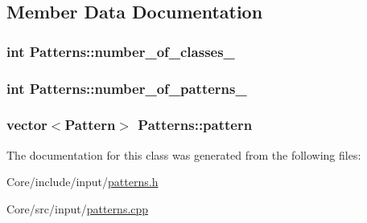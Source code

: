 \subsection{Member Data Documentation}
\hypertarget{classPatterns_aab8d09618ac4738672d7dfce0d462662}{
\subsubsection[{number\+\_\+of\+\_\+classes\+\_\+}]{\setlength{\rightskip}{0pt plus 5cm}int Patterns\+::number\+\_\+of\+\_\+classes\+\_\+\hspace{0.3cm}{\ttfamily [private]}}}\label{classPatterns_aab8d09618ac4738672d7dfce0d462662}
\hypertarget{classPatterns_ad26e3821e74fa46efdac09df9ca0f72a}{
\subsubsection[{number\+\_\+of\+\_\+patterns\+\_\+}]{\setlength{\rightskip}{0pt plus 5cm}int Patterns\+::number\+\_\+of\+\_\+patterns\+\_\+\hspace{0.3cm}{\ttfamily [private]}}}\label{classPatterns_ad26e3821e74fa46efdac09df9ca0f72a}
\hypertarget{classPatterns_ada129f464f3a816c5658f441f8c937ce}{
\subsubsection[{pattern}]{\setlength{\rightskip}{0pt plus 5cm}vector$<${\bf Pattern}$>$ Patterns\+::pattern}}\label{classPatterns_ada129f464f3a816c5658f441f8c937ce}


The documentation for this class was generated from the following files\+:\begin{DoxyCompactItemize}
\item 
Core/include/input/\hyperlink{patterns_8h}{patterns.\+h}\item 
Core/src/input/\hyperlink{patterns_8cpp}{patterns.\+cpp}\end{DoxyCompactItemize}
